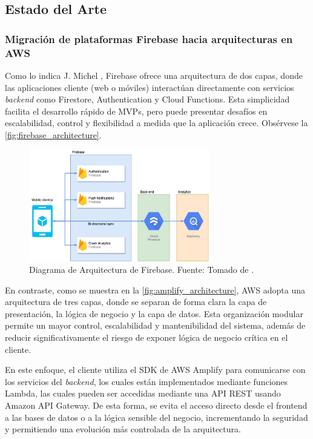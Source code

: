 \subsection{Estado del Arte}

\subsubsection{Migración de plataformas Firebase hacia arquitecturas en AWS}

Como lo indica J. Michel \cite{Michael2021}, Firebase ofrece una arquitectura de dos capas, donde las aplicaciones cliente (web o móviles) interactúan directamente con servicios \textit{backend} como Firestore, Authentication y Cloud Functions. Esta simplicidad facilita el desarrollo rápido de MVPs, pero puede presentar desafíos en escalabilidad, control y flexibilidad a medida que la aplicación crece. Obsérvese la \autoref{fig:firebase_architecture}.

\begin{figure}[H]
  \centering
  \includegraphics[width=0.7\textwidth]{img/figures/fig3-firebase-architecture.png}
  \caption{Diagrama de Arquitectura de Firebase. Fuente: Tomado de \cite{Michael2021}.}
  \label{fig:firebase_architecture}
\end{figure}

En contraste, como se muestra en la \autoref{fig:amplify_architecture}, AWS adopta una arquitectura de tres capas, donde se separan de forma clara la capa de presentación, la lógica de negocio y la capa de datos. Esta organización modular permite un mayor control, escalabilidad y mantenibilidad del sistema, además de reducir significativamente el riesgo de exponer lógica de negocio crítica en el cliente.

En este enfoque, el cliente utiliza el SDK de AWS Amplify para comunicarse con los servicios del \textit{backend}, los cuales están implementados mediante funciones Lambda, las cuales pueden ser accedidas mediante una API REST usando Amazon API Gateway. De esta forma, se evita el acceso directo desde el frontend a las bases de datos o a la lógica sensible del negocio, incrementando la seguridad y permitiendo una evolución más controlada de la arquitectura.

